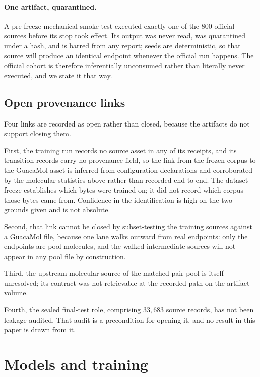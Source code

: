 \paragraph{One artifact, quarantined.}
A pre-freeze mechanical smoke test executed exactly one of the $800$ official sources before its stop took effect.
Its output was never read, was quarantined under a hash, and is barred from any report; seeds are deterministic, so that source will produce an identical endpoint whenever the official run happens.
The official cohort is therefore inferentially unconsumed rather than literally never executed, and we state it that way.


\subsection{Open provenance links}

Four links are recorded as open rather than closed, because the artifacts do not support closing them.

First, the training run records no source asset in any of its receipts, and its transition records carry no provenance field, so the link from the frozen corpus to the GuacaMol asset is inferred from configuration declarations and corroborated by the molecular statistics above rather than recorded end to end. The dataset freeze establishes which bytes were trained on; it did not record which corpus those bytes came from. Confidence in the identification is high on the two grounds given and is not absolute.

Second, that link cannot be closed by subset-testing the training sources against a GuacaMol file, because one lane walks outward from real endpoints: only the endpoints are pool molecules, and the walked intermediate sources will not appear in any pool file by construction.

Third, the upstream molecular source of the matched-pair pool is itself unresolved; its contract was not retrievable at the recorded path on the artifact volume.

Fourth, the sealed final-test role, comprising $33{,}683$ source records, has not been leakage-audited. That audit is a precondition for opening it, and no result in this paper is drawn from it.

\section{Models and training}
\label{app:models}

